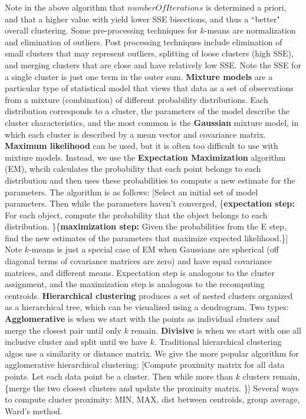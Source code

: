 \documentclass{amsbook}
\theoremstyle{plain}
\theoremstyle{definition}
\theoremstyle{remark}
\begin{document}
Note in the above algorithm that $numberOfIterations$ is determined a priori, and that a higher value with yield lower SSE bisections, and thus a ``better" overall clustering. Some pre-processing techniques for $k$-means are normalization and elimination of outliers. Post processing techniques include elimination of small clusters that may represent outliers, splitting of loose clusters (high SSE), and merging clusters that are close and have relatively low SSE. Note the SSE for a single cluster is just one term in the outer sum. \textbf{Mixture models} are a particular type of statistical model that views that data as a set of observations from a mixture (combination) of different probability distributions. Each distribution corresponds to a cluster, the parameters of the model describe the cluster characteristics, and the most common is the \textbf{Gaussian} mixture model, in which each cluster is described by a mean vector and covariance matrix. \textbf{Maximum likelihood} can be used, but it is often too difficult to use with mixture models. Instead, we use the \textbf{Expectation Maximization} algorithm (EM), whcih calculates the probability that each point belongs to each distribution and then uses these probabilities to compute a new estimate for the parameters. The algorithm is as follows: [Select an initial set of model parameters. Then while the parameters haven't converged, \{\textbf{expectation step:} For each object, compute the probability that the object belongs to each distribution. \}\{\textbf{maximization step: }Given the probabilities from the E step, find the new estimates of the parameters that maximize expected likelihood.\}] Note $k$-means is just a special case of EM when Gaussians are spherical (off diagonal terms of covariance matrices are zero) and have equal covariance matrices, and different means. Expectation step is analogous to the cluster assignment, and the maximization step is analogous to the recomputing centroids. 
\textbf{Hierarchical clustering} produces a set of nested clusters organized as a hierarchical tree, which can be visualized using a dendrogram. Two types: \textbf{Agglomerative} is when we start with the points as individual clusters and merge the closest pair until only $k$ remain. \textbf{Divisive} is when we start with one all inclusive cluster and split until we have $k$. Traditional hierarchical clustering algos use a similarity or distance matrix. We give the more popular algorithm for agglomerative hierarchical clustering: [Compute proximity matrix for all data points. Let each data point be a cluster. Then while more than $k$ clusters remain, \{merge the two closest clusters and update the proximity matrix. \}] Several ways to compute cluster proximity: MIN, MAX, dist between centroids, group average, Ward's method. 
\end{document}
